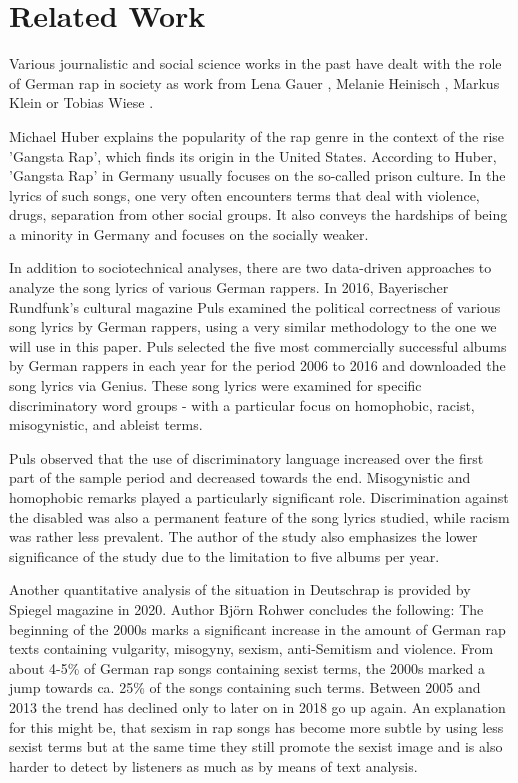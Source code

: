 \section{Related Work}\label{sec:research}

Various journalistic and social science works in the past have dealt with the role of German rap in society as work from Lena Gauer \cite{gauer}, Melanie Heinisch \cite{heinisch}, Markus Klein \cite{klein2011dies} or Tobias Wiese \cite{wiese2021identitat}. 

Michael Huber \cite{wiegangsta} explains the popularity of the rap genre in the context of the rise 'Gangsta Rap', which finds its origin in the United States. According to Huber, 'Gangsta Rap' in Germany usually focuses on the so-called prison culture. In the lyrics of such songs, one very often encounters terms that deal with violence, drugs, separation from other social groups. It also conveys the hardships of being a minority in Germany and focuses on the socially weaker.

In addition to sociotechnical analyses, there are two data-driven approaches to analyze the song lyrics of various German rappers. In 2016, Bayerischer Rundfunk's cultural magazine Puls \cite{puls_2016} examined the political correctness of various song lyrics by German rappers, using a very similar methodology to the one we will use in this paper. Puls selected the five most commercially successful albums by German rappers in each year for the period 2006 to 2016 and downloaded the song lyrics via Genius. These song lyrics were examined for specific discriminatory word groups - with a particular focus on homophobic, racist, misogynistic, and ableist terms.

Puls observed that the use of discriminatory language increased over the first part of the sample period and decreased towards the end. Misogynistic and homophobic remarks played a particularly significant role. Discrimination against the disabled was also a permanent feature of the song lyrics studied, while racism was rather less prevalent. The author of the study also emphasizes the lower significance of the study due to the limitation to five albums per year.

Another quantitative analysis of the situation in Deutschrap is provided by Spiegel magazine \cite{rohwer_2020} in 2020. Author Bj{\"o}rn Rohwer concludes the following: The beginning of the 2000s marks a significant increase in the amount of German rap texts containing vulgarity, misogyny, sexism, anti-Semitism and violence. From about 4-5\% of German rap songs containing sexist terms, the 2000s marked a jump towards ca. 25\% of the songs containing such terms. Between 2005 and 2013 the trend has declined only to later on in 2018 go up again. An explanation for this might be, that sexism in rap songs has become more subtle by using less sexist terms but at the same time they still promote the sexist image and is also harder to detect by listeners as much as by means of text analysis.

